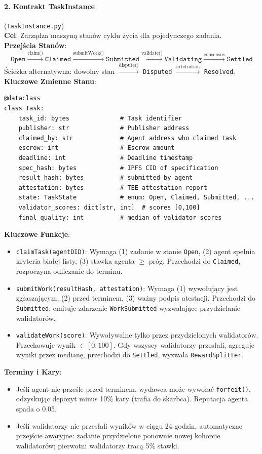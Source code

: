 \documentclass[11pt]{article}
\begin{document}
\paragraph{2. Kontrakt TaskInstance} (\texttt{TaskInstance.py})\\
\textbf{Cel}: Zarządza maszyną stanów cyklu życia dla pojedynczego zadania.\\
\textbf{Przejścia Stanów}:
\begin{equation}
\texttt{Open} \xrightarrow{\text{claim()}} \texttt{Claimed} \xrightarrow{\text{submitWork()}} \texttt{Submitted} \xrightarrow{\text{validate()}} \texttt{Validating} \xrightarrow{\text{consensus}} \texttt{Settled}
\end{equation}
Ścieżka alternatywna: dowolny stan $\xrightarrow{\text{dispute()}}$ \texttt{Disputed} $\xrightarrow{\text{arbitration}}$ \texttt{Resolved}.\\
\textbf{Kluczowe Zmienne Stanu}:
\begin{verbatim}
@dataclass
class Task:
    task_id: bytes              # Task identifier
    publisher: str              # Publisher address
    claimed_by: str             # Agent address who claimed task
    escrow: int                 # Escrow amount
    deadline: int               # Deadline timestamp
    spec_hash: bytes            # IPFS CID of specification
    result_hash: bytes          # submitted by agent
    attestation: bytes          # TEE attestation report
    state: TaskState            # enum: Open, Claimed, Submitted, ...
    validator_scores: dict[str, int]  # scores [0,100]
    final_quality: int          # median of validator scores
\end{verbatim}
\textbf{Kluczowe Funkcje}:
\begin{itemize}[noitemsep]
  \item \texttt{claimTask(agentDID)}: Wymaga (1) zadanie w stanie \texttt{Open}, (2) agent spełnia kryteria białej listy, (3) stawka agenta $\geq$ próg. Przechodzi do \texttt{Claimed}, rozpoczyna odliczanie do terminu.
  \item \texttt{submitWork(resultHash, attestation)}: Wymaga (1) wywołujący jest zgłaszającym, (2) przed terminem, (3) ważny podpis atestacji. Przechodzi do \texttt{Submitted}, emituje zdarzenie \texttt{WorkSubmitted} wyzwalające przydzielanie walidatorów.
  \item \texttt{validateWork(score)}: Wywoływalne tylko przez przydzielonych walidatorów. Przechowuje wynik $\in [0,100]$. Gdy wszyscy walidatorzy przesłali, agreguje wyniki przez medianę, przechodzi do \texttt{Settled}, wyzwala \texttt{RewardSplitter}.
\end{itemize}
\textbf{Terminy i Kary}:
\begin{itemize}[noitemsep]
  \item Jeśli agent nie prześle przed terminem, wydawca może wywołać \texttt{forfeit()}, odzyskując depozyt minus 10\% kary (trafia do skarbca). Reputacja agenta spada o 0.05.
  \item Jeśli walidatorzy nie przesłali wyników w ciągu 24 godzin, automatyczne przejście awaryjne: zadanie przydzielone ponownie nowej kohorcie walidatorów; pierwotni walidatorzy tracą 5\% stawki.
\end{itemize}
\end{document}
